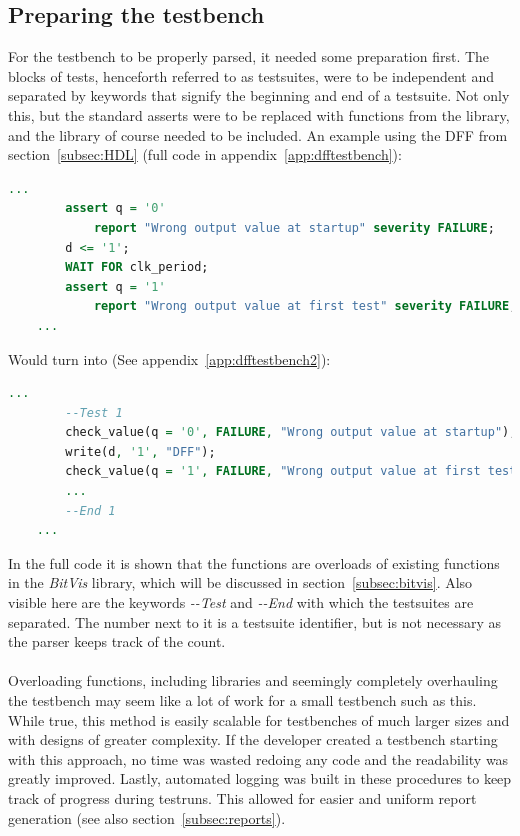\documentclass[11pt,british]{article}
\begin{document}
\subsection{Preparing the testbench}
For the testbench to be properly parsed, it needed some preparation first. The blocks of tests, henceforth referred to as testsuites, were to be independent and separated by keywords that signify the beginning and end of a testsuite. Not only this, but the standard asserts were to be replaced with functions from the library, and the library of course needed to be included. An example using the \gls{DFF} from section~\ref{subsec:HDL} (full code in appendix~\ref{app:dfftestbench}):
\begin{lstlisting}[language=VHDL, tabsize=4, frame=single, framesep=2mm, belowskip=8pt, aboveskip=8pt, showstringspaces=false, basicstyle=\footnotesize]
	...
		assert q = '0'
			report "Wrong output value at startup" severity FAILURE;
		d <= '1';
     	WAIT FOR clk_period;
     	assert q = '1'
			report "Wrong output value at first test" severity FAILURE;
	...
\end{lstlisting}
Would turn into (See appendix~\ref{app:dfftestbench2}):
\begin{lstlisting}[language=VHDL, tabsize=4, frame=single, framesep=2mm, belowskip=8pt, aboveskip=8pt, showstringspaces=false, basicstyle=\footnotesize]
	...
		--Test 1
		check_value(q = '0', FAILURE, "Wrong output value at startup");
		write(d, '1', "DFF");
		check_value(q = '1', FAILURE, "Wrong output value at first test");
		...
		--End 1
	...
\end{lstlisting}
In the full code it is shown that the functions are overloads of existing functions in the \emph{BitVis} library, which will be discussed in section~\ref{subsec:bitvis}. Also visible here are the keywords \emph{-\--Test} and \emph{-\--End} with which the testsuites are separated. The number next to it is a testsuite identifier, but is not necessary as the parser keeps track of the count.
\\
\\
Overloading functions, including libraries and seemingly completely overhauling the testbench may seem like a lot of work for a small testbench such as this. While true, this method is easily scalable for testbenches of much larger sizes and with designs of greater complexity. If the developer created a testbench starting with this approach, no time was wasted redoing any code and the readability was greatly improved. Lastly, automated logging was built in these procedures to keep track of progress during testruns. This allowed for easier and uniform report generation (see also section~\ref{subsec:reports}).
\end{document}
